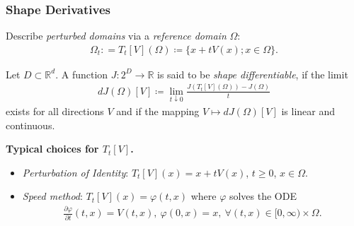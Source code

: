 \documentclass[10pt,xcolor=table,english]{beamer}   %
\begin{document}
\begin{frame}
    \frametitle{Shape Derivatives}
    Describe \textit{perturbed domains} via a \textit{reference domain} $\Omega$:
    \begin{align*}
    \Omega_t : = T_t[V](\Omega)\coloneqq \{x + tV(x); x\in \Omega\}.
    \end{align*}
    \begin{definition}
        Let $D\subset \mathbb{R}^d$. A function $J: 2^D\to \mathbb{R}$ is said to be \emph{shape differentiable}, if the limit
        \begin{align*}
        dJ(\Omega)[V]\coloneqq \lim\limits_{t\downarrow 0} \frac{J(T_t[V](\Omega)) - J(\Omega)}{t}
        \end{align*}
        exists for all directions $V$ and if the mapping $V \mapsto dJ(\Omega)[V]$ is linear and continuous.
    \end{definition}
    \vspace{1cm}
    
    \textbf{Typical choices for $T_t[V]$.}
    \begin{itemize}
        \item \textit{Perturbation of Identity}: $T_t[V](x) = x + tV(x)$, $t\ge 0$, $x\in\Omega$.
        \item \textit{Speed method}: $T_t[V](x) = \varphi(t,x)$ where $\varphi$ solves the ODE
        \begin{align*}
        \frac{\partial\varphi}{\partial t}(t,x) = V(t,x),\ \varphi(0,x) = x,\ \forall (t,x)\in[0,\infty)\times\Omega.
        \end{align*}
    \end{itemize}
\end{frame}
\end{document}
